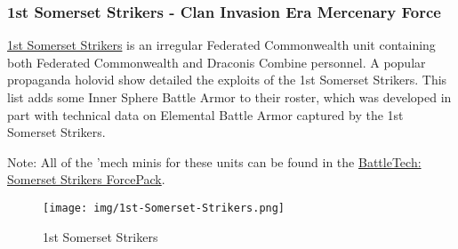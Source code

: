 \subsubsection{1st Somerset Strikers - Clan Invasion Era Mercenary Force}

\href{https://www.sarna.net/wiki/1st_Somerset_Strikers}{1st Somerset Strikers} is an irregular Federated Commonwealth unit containing both Federated Commonwealth and Draconis Combine personnel.
A popular propaganda holovid show detailed the exploits of the 1st Somerset Strikers.
This list adds some Inner Sphere Battle Armor to their roster, which was developed in part with technical data on Elemental Battle Armor captured by the 1st Somerset Strikers.

Note: All of the 'mech minis for these units can be found in the  \href{https://www.sarna.net/wiki/BattleTech:_Somerset_Strikers_ForcePack}{BattleTech: Somerset Strikers ForcePack}.

\begin{figure}[!h]
  \centering
  \texttt{[image: img/1st-Somerset-Strikers.png]}
  \caption*{1st Somerset Strikers}
\end{figure}

